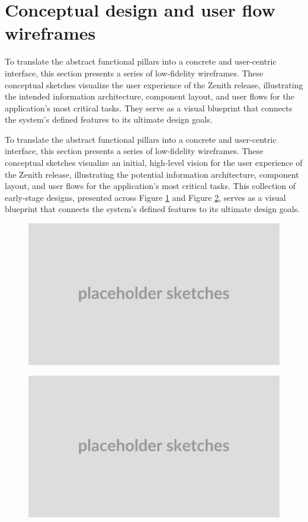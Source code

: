 \section{Conceptual design and user flow wireframes}
To translate the abstract functional pillars into a concrete and user-centric interface, this section presents a series of low-fidelity wireframes. These conceptual sketches visualize the user experience of the Zenith release, illustrating the intended information architecture, component layout, and user flows for the application's most critical tasks. They serve as a visual blueprint that connects the system's defined features to its ultimate design goals.

\textgap

To translate the abstract functional pillars into a concrete and user-centric interface, this section presents a series of low-fidelity wireframes. These conceptual sketches visualize an initial, high-level vision for the user experience of the Zenith release, illustrating the potential information architecture, component layout, and user flows for the application's most critical tasks. This collection of early-stage designs, presented across Figure \ref{fig:sketches_part1} and Figure \ref{fig:sketches_part2}, serves as a visual blueprint that connects the system's defined features to its ultimate design goals.
\begin{figure}[H]
\centering
\includegraphics[width=\textwidth]{images/sketches/placeholder.png}
\label{fig:sketches_part1}
\end{figure}

\begin{figure}[H]
\centering
\includegraphics[width=\textwidth]{images/sketches/placeholder.png}
\label{fig:sketches_part2}
\end{figure}

